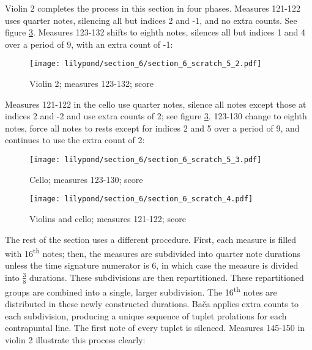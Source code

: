 Violin 2 completes the process in this section in four phases. Measures 121-122 uses quarter notes, silencing all but indices 2 and -1, and no extra counts. See figure \ref{fig:section-6-scratch-4}. Measures 123-132 shifts to eighth notes, silences all but indices 1 and 4 over a period of 9, with an extra count of -1:

\setcounter{figure}{39}
\begin{figure}[H]
    \texttt{[image: lilypond/section\_6/section\_6\_scratch\_5\_2.pdf]}
     \caption{Violin 2; measures 123-132; score}
    \label{fig:section-6-scratch-5-2}
\end{figure}

Measures 121-122 in the cello use quarter notes, silence all notes except those at indices 2 and -2 and use extra counts of 2; see figure \ref{fig:section-6-scratch-4}. 123-130 change to eighth notes, force all notes to rests except for indices 2 and 5 over a period of 9, and continues to use the extra count of 2:

\setcounter{figure}{40}
\begin{figure}[H]
    \texttt{[image: lilypond/section\_6/section\_6\_scratch\_5\_3.pdf]}
     \caption{Cello; measures 123-130; score}
    \label{fig:section-6-scratch-5-3}
\end{figure}

\setcounter{figure}{41}
\begin{figure}[H]
    \texttt{[image: lilypond/section\_6/section\_6\_scratch\_4.pdf]}
     \caption{Violins and cello; measures 121-122; score}
    \label{fig:section-6-scratch-4}
\end{figure}


The rest of the section uses a different procedure. First, each measure is filled with 16\textsuperscript{th} notes; then, the measures are subdivided into quarter note durations unless the time signature numerator is 6, in which case the measure is divided into $\frac{3}{8}$ durations. These subdivisions are then repartitioned. These repartitioned groups are combined into a single, larger subdivision. The 16\textsuperscript{th} notes are distributed in these newly constructed durations. Bača applies extra counts to each subdivision, producing a unique sequence of tuplet prolations for each contrapuntal line.  The first note of every tuplet is silenced. Measures 145-150 in violin 2 illustrate this process clearly:

